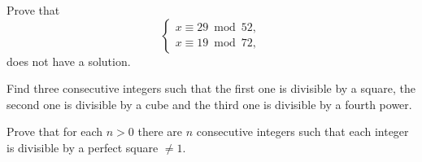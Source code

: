 \begin{bonus}
\label{xca:no_solution}
	Prove that 
	\[
	\begin{cases}
		x\equiv 29\bmod 52,\\
		x\equiv 19\bmod 72,
		\end{cases}
	\]
	does not have a solution.
\end{bonus}

\begin{bonus}
\label{xca:consecutive}
	Find three consecutive integers such that the first one is divisible by a square, 
	the second one is divisible by a cube and the third one is divisible by a fourth power. 	
\end{bonus}

\begin{bonus}
\label{xca:perfect_square}
	Prove that 
	for each $n>0$ there are $n$ consecutive integers such that 
	each integer is divisible by a perfect square $\ne 1$. 	
\end{bonus}


